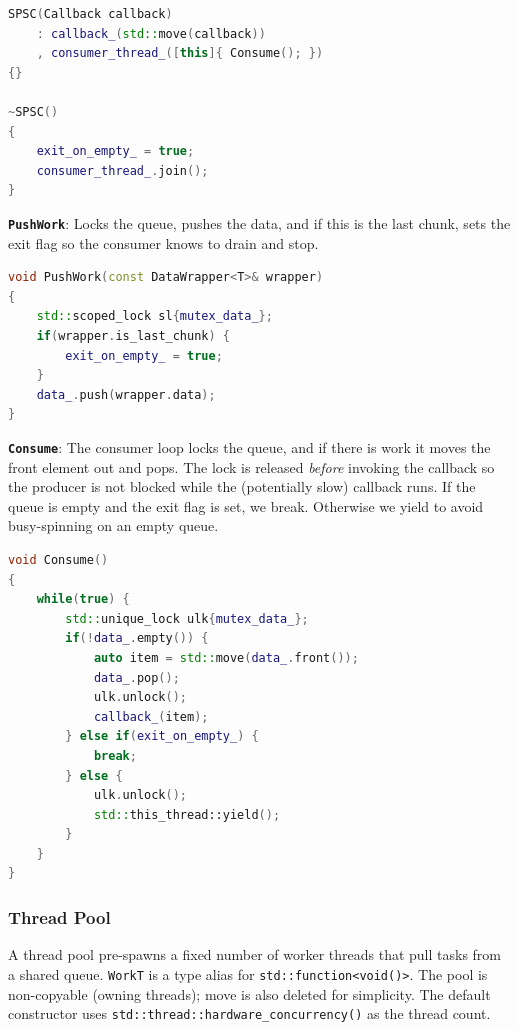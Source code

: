 \documentclass{article}
\begin{document}
\begin{lstlisting}[language=cpp,caption={SPSC constructor and destructor}]
SPSC(Callback callback)
    : callback_(std::move(callback))
    , consumer_thread_([this]{ Consume(); })
{}

~SPSC()
{
    exit_on_empty_ = true;
    consumer_thread_.join();
}
\end{lstlisting}

\textbf{\texttt{PushWork}}: Locks the queue, pushes the data, and if this is the last chunk, sets the exit flag so the consumer knows to drain and stop.

\begin{lstlisting}[language=cpp,caption={SPSC::PushWork}]
void PushWork(const DataWrapper<T>& wrapper)
{
    std::scoped_lock sl{mutex_data_};
    if(wrapper.is_last_chunk) {
        exit_on_empty_ = true;
    }
    data_.push(wrapper.data);
}
\end{lstlisting}

\textbf{\texttt{Consume}}: The consumer loop locks the queue, and if there is work it moves the front element out and pops. The lock is released \emph{before} invoking the callback so the producer is not blocked while the (potentially slow) callback runs. If the queue is empty and the exit flag is set, we break. Otherwise we yield to avoid busy-spinning on an empty queue.

\begin{lstlisting}[language=cpp,caption={SPSC::Consume}]
void Consume()
{
    while(true) {
        std::unique_lock ulk{mutex_data_};
        if(!data_.empty()) {
            auto item = std::move(data_.front());
            data_.pop();
            ulk.unlock();
            callback_(item);
        } else if(exit_on_empty_) {
            break;
        } else {
            ulk.unlock();
            std::this_thread::yield();
        }
    }
}
\end{lstlisting}

\subsubsection{Thread Pool}
A thread pool pre-spawns a fixed number of worker threads that pull tasks from a shared queue. \texttt{WorkT} is a type alias for \texttt{std::function<void()>}. The pool is non-copyable (owning threads); move is also deleted for simplicity. The default constructor uses \texttt{std::thread::hardware\_concurrency()} as the thread count.
\end{document}
